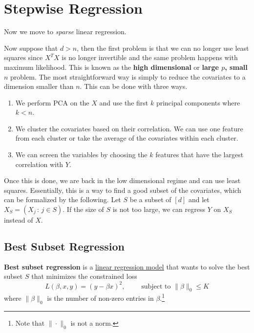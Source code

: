\section{Stepwise Regression} 

  Now we move to \textit{sparse} linear regression. 

  Now suppose that $d > n$, then the first problem is that we can no longer use least squares since $X^T X$ is no longer invertible and the same problem happens with maximum likelihood. This is known as the \textbf{high dimensional} or \textbf{large $p$, small $n$} problem. The most straightforward way is simply to reduce the covariates to a dimension smaller than $n$. This can be done with three ways. 
  \begin{enumerate}
    \item We perform PCA on the $X$ and use the first $k$ principal components where $k < n$. 
    \item We cluster the covariates based on their correlation. We can use one feature from each cluster or take the average of the covariates within each cluster. 
    \item We can screen the variables by choosing the $k$ features that have the largest correlation with $Y$. 
  \end{enumerate}
  Once this is done, we are back in the low dimensional regime and can use least squares. Essentially, this is a way to find a good subset of the covariates, which can be formalized by the following. Let $S$ be a subset of $[d]$ and let $X_S = (X_j \,:\, j \in S)$. If the size of $S$ is not too large, we can regress $Y$ on $X_S$ instead of $X$. 

\subsection{Best Subset Regression}

  \begin{definition}
    \label{def:best-subset-regression}
    \textbf{Best subset regression} is a \hyperref[def:linear-regression-model]{linear regression model} that wants to solve the best subset $S$ that minimizes the constrained loss 
    \begin{equation}
      L(\beta, x, y) =  (y - \beta x)^2, \qquad \text{ subject to } \|\beta\|_0 \leq K
    \end{equation}
    where $\|\beta\|_0$ is the number of non-zero entries in $\beta$.\footnote{Note that $\| \cdot \|_0$ is not a norm.}
  \end{definition}

